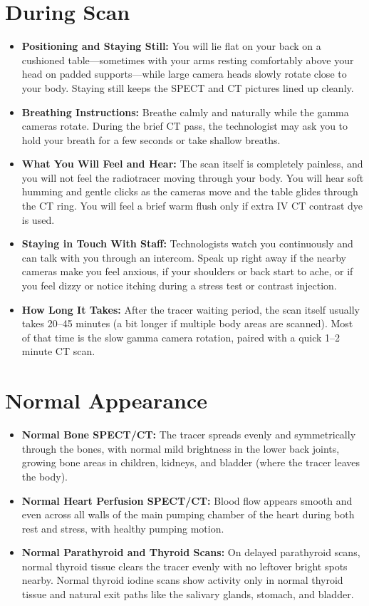 \section{During Scan}
\begin{itemize}
    \item \textbf{Positioning and Staying Still:} You will lie flat on your back on a cushioned table---sometimes with your arms resting comfortably above your head on padded supports---while large camera heads slowly rotate close to your body. Staying still keeps the SPECT and CT pictures lined up cleanly.
    \item \textbf{Breathing Instructions:} Breathe calmly and naturally while the gamma cameras rotate. During the brief CT pass, the technologist may ask you to hold your breath for a few seconds or take shallow breaths.
    \item \textbf{What You Will Feel and Hear:} The scan itself is completely painless, and you will not feel the radiotracer moving through your body. You will hear soft humming and gentle clicks as the cameras move and the table glides through the CT ring. You will feel a brief warm flush only if extra IV CT contrast dye is used.
    \item \textbf{Staying in Touch With Staff:} Technologists watch you continuously and can talk with you through an intercom. Speak up right away if the nearby cameras make you feel anxious, if your shoulders or back start to ache, or if you feel dizzy or notice itching during a stress test or contrast injection.
    \item \textbf{How Long It Takes:} After the tracer waiting period, the scan itself usually takes 20--45 minutes (a bit longer if multiple body areas are scanned). Most of that time is the slow gamma camera rotation, paired with a quick 1--2 minute CT scan.
\end{itemize}

\section{Normal Appearance}
\begin{itemize}
    \item \textbf{Normal Bone SPECT/CT:} The tracer spreads evenly and symmetrically through the bones, with normal mild brightness in the lower back joints, growing bone areas in children, kidneys, and bladder (where the tracer leaves the body).
    \item \textbf{Normal Heart Perfusion SPECT/CT:} Blood flow appears smooth and even across all walls of the main pumping chamber of the heart during both rest and stress, with healthy pumping motion.
    \item \textbf{Normal Parathyroid and Thyroid Scans:} On delayed parathyroid scans, normal thyroid tissue clears the tracer evenly with no leftover bright spots nearby. Normal thyroid iodine scans show activity only in normal thyroid tissue and natural exit paths like the salivary glands, stomach, and bladder.
\end{itemize}

